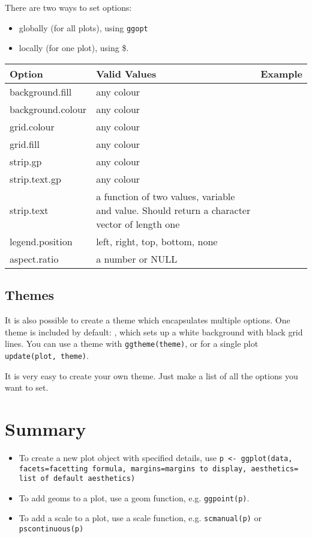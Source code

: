 There are two ways to set options:

\begin{itemize}
  \item globally (for all plots), using {\tt ggopt}
  \item locally (for one plot), using \$. 
\end{itemize}     
                 
\begin{tabular}{lp{1.5in}l}
Option & Valid Values & Example \\
\hline
background.fill    & any colour
& \\
background.colour  & any colour
& \\
grid.colour        & any colour
& \\
grid.fill          & any colour
& \\
strip.gp           & any colour
& \\
strip.text.gp      & any colour
& \\
strip.text         & a function of two values, variable and value.  Should return a character vector of length one
& \\
legend.position    & left, right, top, bottom, none
& \\
aspect.ratio       & a number or NULL
& \\
\hline
\end{tabular}

\subsection{Themes}\label{sub:themes}

It is also possible to create a theme which encapsulates multiple options.  One theme is included by default: {\tt }, which sets up a white background with black grid lines.  You can use a theme with {\tt ggtheme(theme)}, or for a single plot {\tt update(plot, theme)}.

It is very easy to create your own theme.  Just make a list of all the options you want to set.

\section{Summary}\label{sec:summary}

\begin{itemize}
  \item To create a new plot object with specified details, use {\tt p <- ggplot(data, facets=facetting formula, margins=margins to display, aesthetics= list of default aesthetics)}
  \item To add geoms to a plot, use a geom function, e.g. {\tt ggpoint(p)}.  
  \item To add a scale to a plot, use a scale function, e.g. {\tt scmanual(p)} or {\tt pscontinuous(p)}
\end{itemize}


